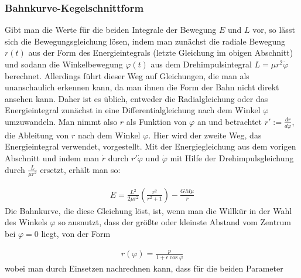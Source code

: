 \documentclass[a4paper,12pt,twoside]{article}
\begin{document}
\subsubsection{Bahnkurve-Kegelschnittform}

Gibt man die Werte für die beiden Integrale der Bewegung \( E \) und \( L \) vor, so lässt sich die Bewegungsgleichung lösen, indem man zunächst die radiale Bewegung \( r(t) \) aus der Form des Energieintegrals (letzte Gleichung im obigen Abschnitt) und sodann die Winkelbewegung \( \varphi(t) \) aus dem Drehimpulsintegral \( L = \mu r^2 \dot{\varphi} \) berechnet. 
Allerdings führt dieser Weg auf Gleichungen, die man als unanschaulich erkennen kann, da man ihnen die Form der Bahn nicht direkt ansehen kann.
Daher ist es üblich, entweder die Radialgleichung oder das Energieintegral zunächst in eine Differentialgleichung nach dem Winkel \( \varphi \) umzuwandeln. Man nimmt also \( r \) als Funktion von \( \varphi \) an und betrachtet \( r' := \frac{dr}{d\varphi} \), die Ableitung von \( r \) nach dem Winkel \( \varphi \). 
Hier wird der zweite Weg, das Energieintegral verwendet, vorgestellt. 
Mit der Energiegleichung aus dem vorigen Abschnitt und indem man \( \dot{r} \) durch \( r' \dot{\varphi} \) und \( \dot{\varphi} \) mit Hilfe der Drehimpulsgleichung durch \( \frac{L}{\mu r^2} \) ersetzt, erhält man so:

\begin{align*}
	E = \frac{L^2}{2\mu r^2} \left( \frac{r^2}{r^2 + 1} \right) - \frac{GM\mu}{r}
\end{align*}
Die Bahnkurve, die diese Gleichung löst, ist, wenn man die Willkür in der Wahl des Winkels \( \varphi \) so ausnutzt, dass der größte oder kleinste Abstand vom Zentrum bei \( \varphi = 0 \) liegt, von der Form

\begin{align*}
	r(\varphi) = \frac{p}{1 + \epsilon \cos \varphi}
\end{align*}
wobei man durch Einsetzen nachrechnen kann, dass für die beiden Parameter
\end{document}
